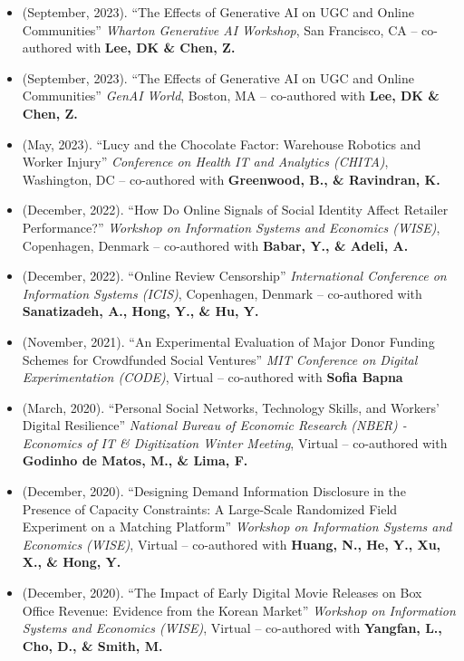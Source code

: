 \documentclass[10.5pt,letterpaper,sans]{moderncv}        %
\begin{document}
\begin{itemize}

\item (September, 2023). ``The Effects of Generative AI on UGC and Online Communities'' \textit{Wharton Generative AI Workshop}, San Francisco, CA -- co-authored with \textbf{Lee, DK \& Chen, Z.} 

\item (September, 2023). ``The Effects of Generative AI on UGC and Online Communities'' \textit{GenAI World}, Boston, MA -- co-authored with \textbf{Lee, DK \& Chen, Z.} 

\item (May, 2023). ``Lucy and the Chocolate Factor: Warehouse Robotics and Worker Injury'' \textit{Conference on Health IT and Analytics (CHITA)}, Washington, DC -- co-authored with \textbf{Greenwood, B., \& Ravindran, K.} 

\item (December, 2022). ``How Do Online Signals of Social Identity Affect Retailer Performance?'' \textit{Workshop on Information Systems and Economics (WISE)}, Copenhagen, Denmark -- co-authored with \textbf{Babar, Y., \& Adeli, A.} 

\item (December, 2022). ``Online Review Censorship'' \textit{International Conference on Information Systems (ICIS)}, Copenhagen, Denmark -- co-authored with \textbf{Sanatizadeh, A., Hong, Y., \& Hu, Y.} 

\item (November, 2021). ``An Experimental Evaluation of Major Donor Funding Schemes for Crowdfunded Social Ventures'' \textit{MIT Conference on Digital Experimentation (CODE)}, Virtual -- co-authored with \textbf{Sofia Bapna} 

\item (March, 2020). ``Personal Social Networks, Technology Skills, and Workers' Digital Resilience'' \textit{National Bureau of Economic Research (NBER) - Economics of IT \& Digitization Winter Meeting}, Virtual -- co-authored with \textbf{Godinho de Matos, M., \& Lima, F.} 

\item (December, 2020). ``Designing Demand Information Disclosure in the Presence of Capacity Constraints: A Large-Scale Randomized Field Experiment on a Matching Platform'' \textit{Workshop on Information Systems and Economics (WISE)}, Virtual -- co-authored with \textbf{Huang, N., He, Y., Xu, X., \& Hong, Y.} 

\item (December, 2020). ``The Impact of Early Digital Movie Releases on Box Office Revenue: Evidence from the Korean Market'' \textit{Workshop on Information Systems and Economics (WISE)}, Virtual -- co-authored with \textbf{Yangfan, L., Cho, D., \& Smith, M.} 


\end{itemize}
\end{document}
